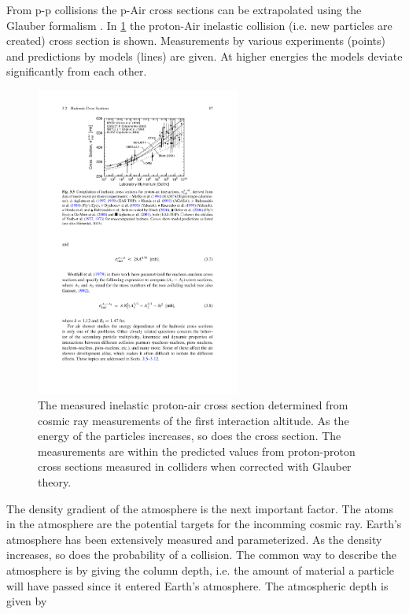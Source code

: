 From p-p collisions the p-Air cross sections can be extrapolated using the Glauber formalism \cite{glauber1955crosssections,abbasi2015crosssection}. In \cref{fig:pair_crosssection} the proton-Air inelastic collision (i.e. new particles are created) cross section is shown. Measurements by various experiments (points) and predictions by models (lines) are given. At higher energies the models deviate significantly from each other.

\begin{figure}
    \centering
    \includegraphics[width=0.6\textwidth]
                    {plots/cosmic-rays/pair_crosssection}
    \caption{The measured inelastic proton-air cross section determined from cosmic ray measurements of the first interaction altitude. As the energy of the particles increases, so does the cross section. The measurements are within the predicted values from proton-proton cross sections measured in colliders when corrected with Glauber theory.}
    \label{fig:pair_crosssection}
\end{figure}


The density gradient of the atmosphere is the next important factor. The atoms in the atmosphere are the potential targets for the incomming cosmic ray. Earth's atmosphere has been extensively measured and parameterized. As the density increases, so does the probability of a collision. The common way to describe the atmosphere is by giving the column depth, i.e. the amount of material a particle will have passed since it entered Earth's atmosphere. The atmospheric depth is given by

